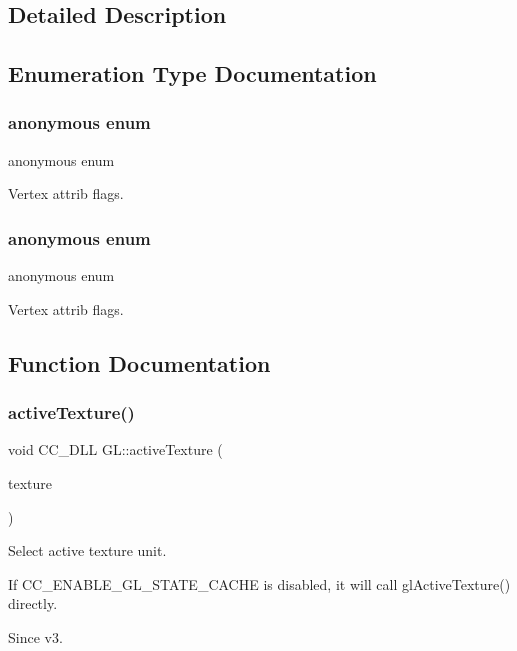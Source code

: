 \subsection{Detailed Description}


\subsection{Enumeration Type Documentation}
\mbox{\label{group__renderer_ga2b58b52face99869a0b7fb5eed3cb8ab}} 
\subsubsection{\texorpdfstring{anonymous enum}{anonymous enum}}
{\footnotesize\ttfamily anonymous enum}

Vertex attrib flags. \mbox{\label{group__renderer_ga7c96bf15d75342fb26c98e385011e936}} 
\subsubsection{\texorpdfstring{anonymous enum}{anonymous enum}}
{\footnotesize\ttfamily anonymous enum}

Vertex attrib flags. 

\subsection{Function Documentation}
\mbox{\label{group__renderer_ga2a75af9e657f32a5d6832a419118d449}} 
\subsubsection{\texorpdfstring{active\+Texture()}{activeTexture()}}
{\footnotesize\ttfamily void C\+C\+\_\+\+D\+LL G\+L\+::active\+Texture (\begin{DoxyParamCaption}\item[{G\+Lenum}]{texture }\end{DoxyParamCaption})}

Select active texture unit.

If C\+C\+\_\+\+E\+N\+A\+B\+L\+E\+\_\+\+G\+L\+\_\+\+S\+T\+A\+T\+E\+\_\+\+C\+A\+C\+HE is disabled, it will call gl\+Active\+Texture() directly. \begin{DoxySince}{Since}
v3. 
\end{DoxySince}
\mbox{\label{group__renderer_ga9cb186f49883ba35d09424da1797736f}} 
